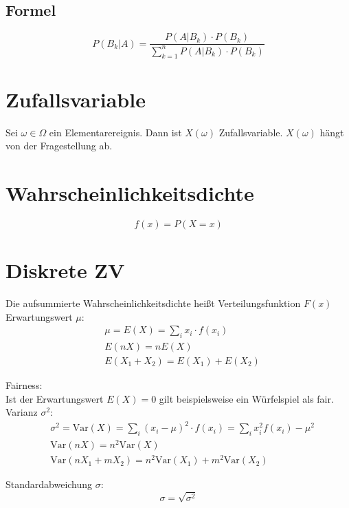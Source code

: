 \subsection{Formel}
\begin{equation}
	P(B_k|A) = \frac{P(A|B_k)\cdot P(B_k)}{\sum\limits_{k=1}^n P(A|B_k) \cdot P(B_k)}
\end{equation}

\section{Zufallsvariable}
Sei $\omega \in \Omega$ ein Elementarereignis. Dann ist $X(\omega)$ Zufallsvariable. $X(\omega)$ hängt von der Fragestellung ab.

\section{Wahrscheinlichkeitsdichte}
\begin{equation}
	f(x) = P(X = x)
\end{equation}

\section{Diskrete ZV}
Die aufsummierte Wahrscheinlichkeitsdichte heißt Verteilungsfunktion $F(x)$\\
Erwartungswert $\mu$:
\begin{align}
	& \mu = E(X) = \sum_i x_i \cdot f(x_i)\\
	& E(nX) = nE(X)\\
	& E(X_1 + X_2) = E(X_1) + E(X_2)
\end{align}

Fairness:\\
Ist der Erwartungswert $E(X) = 0$ gilt beispielsweise ein Würfelspiel als fair.\\


Varianz $\sigma^2$:
\begin{align}
	& \sigma^2 = \mathrm{Var}(X)=\sum_i(x_i-\mu)^2\cdot f(x_i) = \sum_i x_i^2f(x_i)-\mu^2\\
	& \mathrm{Var}(nX) = n^2\mathrm{Var}(X)\\
	& \mathrm{Var}(nX_1+mX_2) = n^2\mathrm{Var}(X_1) + m^2\mathrm{Var}(X_2)
\end{align}

Standardabweichung $\sigma$:
\begin{equation}
	\sigma = \sqrt{\sigma^2}
\end{equation}

